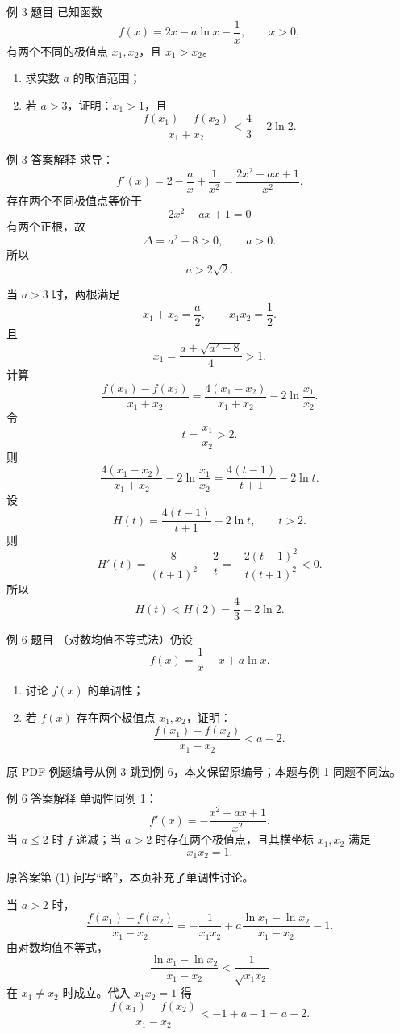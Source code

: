 ﻿\documentclass[aspectratio=169,10pt]{ctexbeamer}
\newcommand{\auditnote}[1]{\par\medskip{\color{Warn}\bfseries 原答案疏漏/补充：}#1}
\newcommand{\ocrnote}[1]{\par\medskip{\color{Warn}\bfseries 原文校验说明：}#1}
\begin{document}
\begin{frame}{例 3 题目}
\small
已知函数
\[
f(x)=2x-a\ln x-\frac1x,\qquad x>0,
\]
有两个不同的极值点 $x_1,x_2$，且 $x_1>x_2$。
\begin{enumerate}
  \item 求实数 $a$ 的取值范围；
  \item 若 $a>3$，证明：$x_1>1$，且
  \[
  \frac{f(x_1)-f(x_2)}{x_1+x_2}<\frac43-2\ln2.
  \]
\end{enumerate}
\end{frame}

\begin{frame}[allowframebreaks]{例 3 答案解释}
\small
求导：
\[
f'(x)=2-\frac ax+\frac1{x^2}
=\frac{2x^2-ax+1}{x^2}.
\]
存在两个不同极值点等价于
\[
2x^2-ax+1=0
\]
有两个正根，故
\[
\Delta=a^2-8>0,\qquad a>0.
\]
所以
\[
\boxed{a>2\sqrt2}.
\]

\framebreak

当 $a>3$ 时，两根满足
\[
x_1+x_2=\frac a2,\qquad x_1x_2=\frac12.
\]
且
\[
x_1=\frac{a+\sqrt{a^2-8}}4>1.
\]
计算
\[
\frac{f(x_1)-f(x_2)}{x_1+x_2}
=\frac{4(x_1-x_2)}{x_1+x_2}-2\ln\frac{x_1}{x_2}.
\]
令
\[
t=\frac{x_1}{x_2}>2.
\]
则
\[
\frac{4(x_1-x_2)}{x_1+x_2}-2\ln\frac{x_1}{x_2}
=\frac{4(t-1)}{t+1}-2\ln t.
\]
设
\[
H(t)=\frac{4(t-1)}{t+1}-2\ln t,\qquad t>2.
\]
则
\[
H'(t)=\frac8{(t+1)^2}-\frac2t
=-\frac{2(t-1)^2}{t(t+1)^2}<0.
\]
所以
\[
H(t)<H(2)=\frac43-2\ln2.
\]
\end{frame}

\begin{frame}{例 6 题目}
\small
（对数均值不等式法）仍设
\[
f(x)=\frac1x-x+a\ln x.
\]
\begin{enumerate}
  \item 讨论 $f(x)$ 的单调性；
  \item 若 $f(x)$ 存在两个极值点 $x_1,x_2$，证明：
  \[
  \frac{f(x_1)-f(x_2)}{x_1-x_2}<a-2.
  \]
\end{enumerate}
\ocrnote{原 PDF 例题编号从例 3 跳到例 6，本文保留原编号；本题与例 1 同题不同法。}
\end{frame}

\begin{frame}[allowframebreaks]{例 6 答案解释}
\small
单调性同例 1：
\[
f'(x)=-\frac{x^2-ax+1}{x^2}.
\]
当 $a\le2$ 时 $f$ 递减；当 $a>2$ 时存在两个极值点，且其横坐标 $x_1,x_2$ 满足
\[
x_1x_2=1.
\]

\auditnote{原答案第 (1) 问写“略”，本页补充了单调性讨论。}

\framebreak

当 $a>2$ 时，
\[
\frac{f(x_1)-f(x_2)}{x_1-x_2}
=-\frac1{x_1x_2}+a\frac{\ln x_1-\ln x_2}{x_1-x_2}-1.
\]
由对数均值不等式，
\[
\frac{\ln x_1-\ln x_2}{x_1-x_2}<\frac1{\sqrt{x_1x_2}}
\]
在 $x_1\ne x_2$ 时成立。代入 $x_1x_2=1$ 得
\[
\frac{f(x_1)-f(x_2)}{x_1-x_2}
< -1+a-1=a-2.
\]
\end{frame}
\end{document}
